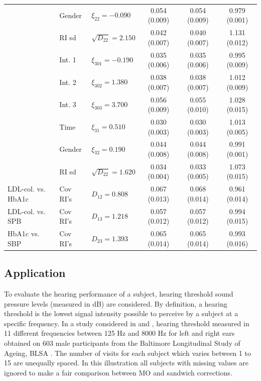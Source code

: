 \documentclass[11pt,a5paper,twoside]{book}
\begin{document}
{{\begin{table}[ht]
{{{\begin{tabular}{lllccc}
&Gender  &$\xi_{22}=-0.090$ & 0.054 (0.009) & 0.054 (0.009) & 0.979 (0.001)  \\ \vspace*{1mm} 
&RI sd  &$\sqrt{D_{22}}=2.150$ & 0.042 (0.007) & 0.040 (0.007) & 1.131 (0.012)  \\ \vspace*{1mm} 
\multirow{4}{*}{SBP}&Int. 1   &$\xi_{301}=-0.190$ & 0.035 (0.006) & 0.035 (0.006) & 0.995 (0.009)  \\ \vspace*{1mm} 
&Int. 2   &$\xi_{302}=1.380$ & 0.038 (0.007) & 0.038 (0.007) & 1.012 (0.009)  \\ \vspace*{1mm} 
&Int. 3   &$\xi_{303}=3.700$ & 0.056 (0.009) & 0.055 (0.010) & 1.028 (0.015)  \\ \vspace*{1mm} 
&Time   &$\xi_{31}=0.510$ & 0.030 (0.003) & 0.030 (0.003) & 1.013 (0.005)  \\ \vspace*{1mm} 
&Gender   &$\xi_{32}=0.190$ & 0.044 (0.008) & 0.044 (0.008) & 0.991 (0.001)  \\ \vspace*{1mm} 
&RI sd  &$\sqrt{D_{22}}=1.620$ & 0.034 (0.004) & 0.033 (0.005) & 1.073 (0.015)  \\ \vspace*{1mm} 
LDL-col. vs. HbA1c&Cov RI's &$D_{12}=0.808$ & 0.067 (0.013) & 0.068 (0.014) & 0.961 (0.014)  \\ \vspace*{1mm} 
LDL-col. vs. SPB&Cov RI's  &$D_{13}=1.218$ & 0.057 (0.012) & 0.057 (0.012) & 0.994 (0.015)  \\ \vspace*{1mm} 
HbA1c vs. SBP&Cov RI's   &$D_{23}=1.393$ & 0.065 (0.014) & 0.065 (0.014) & 0.993 (0.016)  \\ 
   \hline
\end{tabular}} }}
\end{table}

}}


\subsection{Application}
\label{sec_application}
To evaluate the hearing performance of a subject, hearing threshold sound pressure levels (measured in dB) are considered. By definition, a hearing threshold is the lowest signal intensity possible to perceive by a subject at a specific frequency. In a study considered in \cite{Molenberghs2000} and \cite{Verbeke2006}, hearing threshold measured in 11 different frequencies between 125 Hz and 8000 Hz for left and right ears obtained on 603 male participants from the Baltimore Longitudinal Study of Ageing, BLSA \citep{shock1984}. The number of visits for each subject which varies between 1 to 15 are unequally spaced. In this illustration all subjects with missing values are ignored to make a fair comparison between MO and sandwich corrections.
\end{document}
